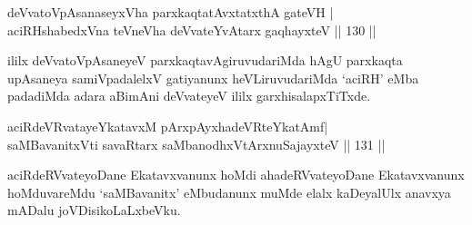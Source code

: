 
\begin{shl}
deVvatoVpAsanaseyxVha parxkaqtatAvxtatxthA gateVH | \\
aciRHshabedxVna teVneVha deVvateYvAtarx gaqhayxteV \hfill|| 130 || 
\end{shl}

\begin{artha}
ililx deVvatoVpAsaneyeV parxkaqtavAgiruvudariMda hAgU parxkaqta
upAsaneya samiVpadalelxV gatiyanunx heVLiruvudariMda `aciRH' eMba
padadiMda adara aBimAni deVvateyeV ililx garxhisalapxTiTxde. 
\end{artha}

\begin{shl}
aciRdeVRvatayeYkatavxM pArxpAyxhadeVRteYkatAmf\footnotemark[1] | \\
saMBavanitxVti savaRtarx saMbanodhxV\s tArxnuSajayxteV \hfill|| 131 || 
\end{shl}

\begin{artha}
aciRdeRVvateyoDane Ekatavxvanunx hoMdi ahadeRVvateyoDane Ekatavxvanunx
hoMduvareMdu `saMBavanitx' eMbudanunx muMde elalx kaDeyalUlx anavxya
mADalu joVDisikoLaLxbeVku.
\end{artha}


